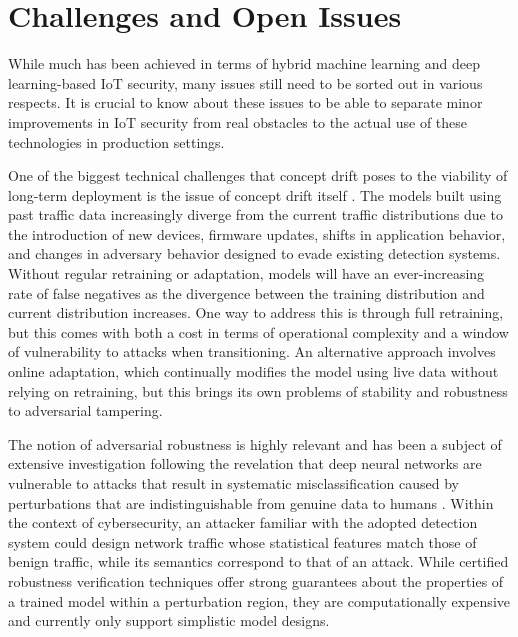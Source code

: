 \documentclass[12pt]{article}
\begin{document}
\section{Challenges and Open Issues}

While much has been achieved in terms of hybrid machine learning and deep learning-based IoT security, many issues still need to be sorted out in various respects. It is crucial to know about these issues to be able to separate minor improvements in IoT security from real obstacles to the actual use of these technologies in production settings.

One of the biggest technical challenges that concept drift poses to the viability of long-term deployment is the issue of concept drift itself \cite{xiao2019iot}. The models built using past traffic data increasingly diverge from the current traffic distributions due to the introduction of new devices, firmware updates, shifts in application behavior, and changes in adversary behavior designed to evade existing detection systems. Without regular retraining or adaptation, models will have an ever-increasing rate of false negatives as the divergence between the training distribution and current distribution increases. One way to address this is through full retraining, but this comes with both a cost in terms of operational complexity and a window of vulnerability to attacks when transitioning. An alternative approach involves online adaptation, which continually modifies the model using live data without relying on retraining, but this brings its own problems of stability and robustness to adversarial tampering.

The notion of adversarial robustness is highly relevant and has been a subject of extensive investigation following the revelation that deep neural networks are vulnerable to attacks that result in systematic misclassification caused by perturbations that are indistinguishable from genuine data to humans \cite{vinayakumar2019deep}. Within the context of cybersecurity, an attacker familiar with the adopted detection system could design network traffic whose statistical features match those of benign traffic, while its semantics correspond to that of an attack. While certified robustness verification techniques offer strong guarantees about the properties of a trained model within a perturbation region, they are computationally expensive and currently only support simplistic model designs.
\end{document}
